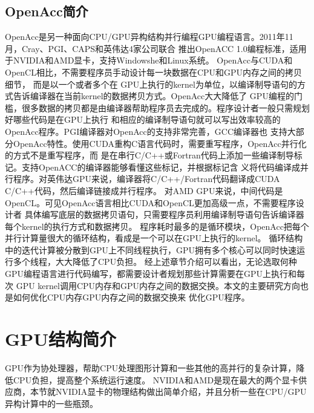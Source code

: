 \subsection{OpenAcc简介}
OpenAcc是另一种面向CPU/GPU异构结构并行编程GPU编程语言。2011年11月，Cray、PGI、CAPS和英伟达4家公司联合
推出OpenACC 1.0编程标准，适用于NVIDIA和AMD显卡，支持Windowshe和Linux系统。
OpenAcc与CUDA和OpenCL相比，不需要程序员手动设计每一块数据在CPU和GPU内存之间的拷贝细节，
而是以一个或者多个在
GPU上执行的kernel为单位，以编译制导语句的方式告诉编译器在当前kernel的数据拷贝方式。OpenAcc大大降低了
GPU编程的门槛，很多数据的拷贝都是由编译器帮助程序员去完成的。程序设计者一般只需规划好哪些代码是在GPU上执行
和相应的编译制导语句就可以写出效率较高的OpenAcc程序。PGI编译器对OpenAcc的支持非常完善，GCC编译器也
支持大部分OpenAcc特性。使用CUDA重构C语言代码时，需要重写程序，OpenAcc并行化的方式不是重写程序，而
是在串行C/C++或Fortran代码上添加一些编译制导标记。支持OpenACC的编译器能够看懂这些标记，并根据标记含
义将代码编译成并行程序。对英伟达GPU来说，编译器将C/C++/Fortran代码翻译成CUDA C/C++代码，然后编译链接成并行程序。
对AMD GPU来说，中间代码是OpenCL。可见OpenAcc语言相比CUDA和OpenCL更加高级一点，不需要程序设计者
具体编写底层的数据拷贝语句，只需要程序员利用编译制导语句告诉编译器每个kernel的执行方式和数据拷贝。
程序耗时最多的是循环模块，OpenAcc把每个并行计算量很大的循环结构，看成是一个可以在GPU上执行的kernel。
循环结构中的迭代计算被分散到GPU上不同线程执行，GPU拥有多个核心可以同时快速运行多个线程，大大降低了CPU负担。
经上述章节介绍可以看出，无论选取何种GPU编程语言进行代码编写，都需要设计者规划那些计算需要在GPU上执行和每次
GPU kernel调用CPU内存和GPU内存之间的数据交换。本文的主要研究方向也是如何优化CPU内存GPU内存之间的数据交换来
优化GPU程序。

\section{GPU结构简介}
GPU作为协处理器，帮助CPU处理图形计算和一些其他的高并行的复杂计算，降低CPU负担，提高整个系统运行速度。
NVIDIA和AMD是现在最大的两个显卡供应商，本节就NVIDIA显卡的物理结构做出简单介绍，并且分析一些在CPU/GPU
异构计算中的一些瓶颈。
